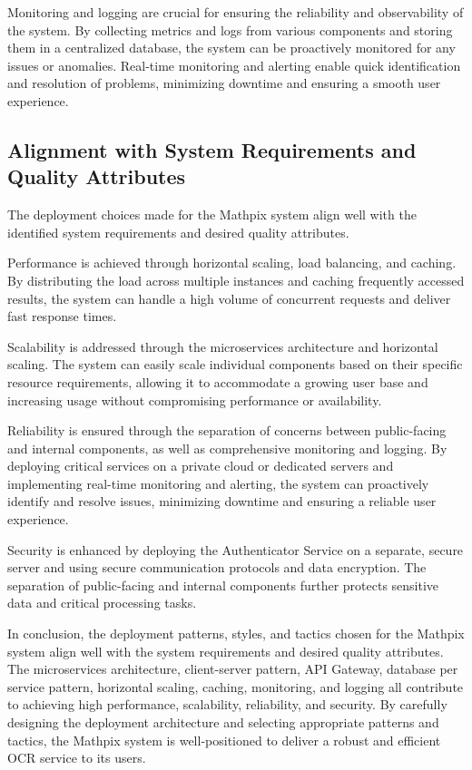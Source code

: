 \documentclass{article}
\begin{document}
Monitoring and logging are crucial for ensuring the reliability and observability of the system. By collecting metrics and logs from various components and storing them in a centralized database, the system can be proactively monitored for any issues or anomalies. Real-time monitoring and alerting enable quick identification and resolution of problems, minimizing downtime and ensuring a smooth user experience.

\subsection{Alignment with System Requirements and Quality Attributes}
The deployment choices made for the Mathpix system align well with the identified system requirements and desired quality attributes.

Performance is achieved through horizontal scaling, load balancing, and caching. By distributing the load across multiple instances and caching frequently accessed results, the system can handle a high volume of concurrent requests and deliver fast response times.

Scalability is addressed through the microservices architecture and horizontal scaling. The system can easily scale individual components based on their specific resource requirements, allowing it to accommodate a growing user base and increasing usage without compromising performance or availability.

Reliability is ensured through the separation of concerns between public-facing and internal components, as well as comprehensive monitoring and logging. By deploying critical services on a private cloud or dedicated servers and implementing real-time monitoring and alerting, the system can proactively identify and resolve issues, minimizing downtime and ensuring a reliable user experience.

Security is enhanced by deploying the Authenticator Service on a separate, secure server and using secure communication protocols and data encryption. The separation of public-facing and internal components further protects sensitive data and critical processing tasks.

In conclusion, the deployment patterns, styles, and tactics chosen for the Mathpix system align well with the system requirements and desired quality attributes. The microservices architecture, client-server pattern, API Gateway, database per service pattern, horizontal scaling, caching, monitoring, and logging all contribute to achieving high performance, scalability, reliability, and security. By carefully designing the deployment architecture and selecting appropriate patterns and tactics, the Mathpix system is well-positioned to deliver a robust and efficient OCR service to its users.
\end{document}
